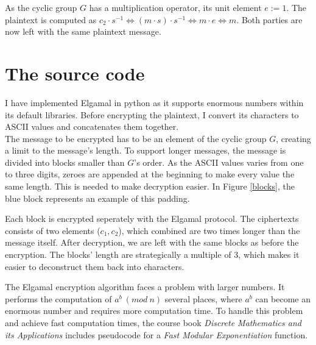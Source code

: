 \documentclass{article}
\begin{document}
As the cyclic group $G$ has a multiplication operator, its unit element $e := 1$. The plaintext is computed as $c_2 \cdot s^{-1} \Leftrightarrow (m \cdot s) \cdot s^{-1} \Leftrightarrow m \cdot e \Leftrightarrow m$. Both parties are now left with the same plaintext message.

\newpage
\section{The source code}
I have implemented Elgamal in python as it supports enormous numbers within its default libraries. Before encrypting the plaintext, I convert its characters to ASCII values and concatenates them together.\\

The message to be encrypted has to be an element of the cyclic group $G$, creating a limit to the message's length. To support longer messages, the message is divided into blocks smaller than $G$'s order. As the ASCII values varies from one to three digits, zeroes are appended at the beginning to make every value the same length. This is needed to make decryption easier. In Figure \ref{blocks}, the blue block represents an example of this padding. 

Each block is encrypted seperately with the Elgamal protocol. The ciphertexts consists of two elements ($c_1, c_2$), which combined are two times longer than the message itself. After decryption, we are left with the same blocks as before the encryption. The blocks' length are strategically a multiple of 3, which makes it easier to deconstruct them back into characters.  

The Elgamal encryption algorithm faces a problem with larger numbers. It performs the computation of $a^b\ (mod\ n)$ several places, where $a^b$ can become an enormous number and requires more computation time. To handle this problem and achieve fast computation times, the course book \textit{Discrete Mathematics and its Applications} includes pseudocode for a \textit{Fast Modular Exponentiation} function.
\end{document}
